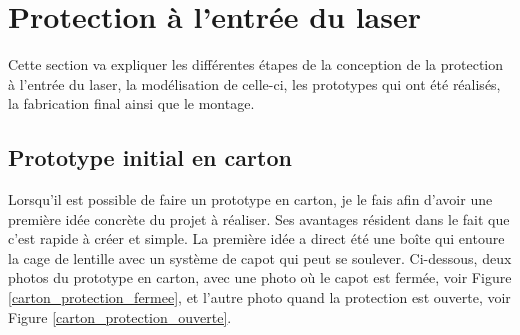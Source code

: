 \section{Protection à l'entrée du laser}
Cette section va expliquer les différentes étapes de la conception de la protection à l'entrée du laser, la modélisation de celle-ci, les prototypes qui ont été réalisés, la fabrication final ainsi que le montage.
\subsection{Prototype initial en carton}
Lorsqu'il est possible de faire un prototype en carton, je le fais afin d'avoir une première idée concrète du projet à réaliser. Ses avantages résident dans le fait que c'est rapide à créer et simple. La première idée a direct été une boîte qui entoure la cage de lentille avec un système de capot qui peut se soulever. Ci-dessous, deux photos du prototype en carton, avec une photo où le capot est fermée, voir Figure \ref{carton_protection_fermee}, et l'autre photo quand la protection est ouverte, voir Figure \ref{carton_protection_ouverte}.

